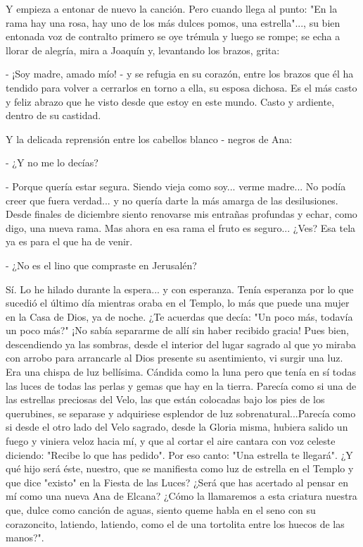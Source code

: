 \documentclass[12pt, twoside, openright]{book} %
\begin{document}
Y empieza a entonar de nuevo la canción. Pero cuando llega al punto: "En la rama hay una rosa, hay uno de los más dulces pomos, una estrella"..., su bien entonada voz de contralto primero se oye trémula y luego se rompe; se echa a llorar de alegría, mira a Joaquín y, levantando los brazos, grita: 

- ¡Soy madre, amado mío! - y se refugia en su corazón, entre los brazos que él ha tendido para volver a cerrarlos en torno a ella, su esposa dichosa. Es el más casto y feliz abrazo que he visto desde que estoy en este mundo. Casto y ardiente, dentro de su castidad. 

Y la delicada reprensión entre los cabellos blanco - negros de Ana: 

- ¿Y no me lo decías? 

- Porque quería estar segura. Siendo vieja como soy... verme madre... No podía creer que fuera verdad... y no quería darte la más amarga de las desilusiones. Desde finales de diciembre siento renovarse mis entrañas profundas y echar, como digo, una nueva rama. Mas ahora en esa rama el fruto es seguro... ¿Ves? Esa tela ya es para el que ha de venir. 

- ¿No es el lino que compraste en Jerusalén? 

Sí. Lo he hilado durante la espera... y con esperanza. Tenía esperanza por lo que sucedió el último día mientras oraba en el Templo, lo más que puede una mujer en la Casa de Dios, ya de noche. ¿Te acuerdas que decía: "Un poco más, todavía un poco más?" ¡No sabía separarme de allí sin haber recibido gracia! Pues bien, descendiendo ya las sombras, desde el interior del lugar sagrado al que yo miraba con arrobo para arrancarle al Dios presente su asentimiento, vi surgir una luz. Era una chispa de luz bellísima. Cándida como la luna pero que tenía en sí todas las luces de todas las perlas y gemas que hay en la tierra. Parecía como si una de las estrellas preciosas del Velo, las que están colocadas bajo los pies de los querubines, se separase y adquiriese esplendor de luz sobrenatural...Parecía como si desde el otro lado del Velo sagrado, desde la Gloria misma, hubiera salido un fuego y viniera veloz hacia mí, y que al cortar el aire cantara con voz celeste diciendo: "Recibe lo que has pedido". Por eso canto: "Una estrella te llegará". ¿Y qué hijo será éste, nuestro, que se manifiesta como luz de estrella en el Templo y que dice "existo" en la Fiesta de las Luces? ¿Será que has acertado al pensar en mí como una nueva Ana de Elcana? ¿Cómo la llamaremos a esta criatura nuestra que, dulce como canción de aguas, siento queme habla en el seno con su corazoncito, latiendo, latiendo, como el de una tortolita entre los huecos de las manos?". 
\end{document}

